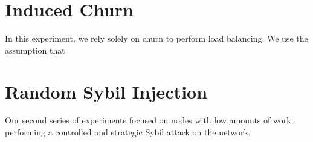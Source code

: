 \section{Induced Churn}
In this experiment, we rely solely on churn to perform load balancing.
We use the assumption that 

\section{Random Sybil Injection}
Our second series of experiments focused on nodes with low amounts of work performing a controlled and strategic Sybil attack \cite{sybil} on the network.

